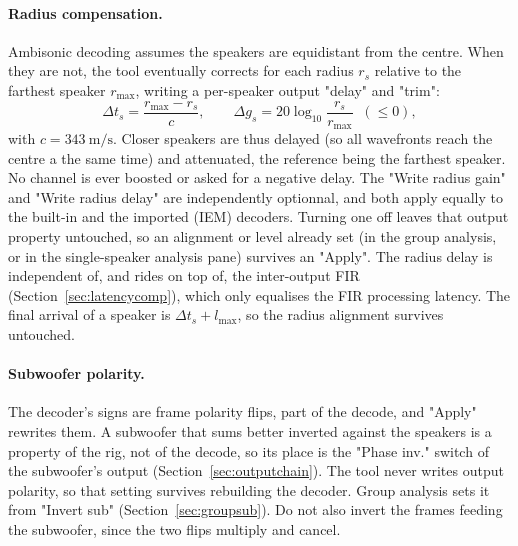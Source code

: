 \paragraph{Radius compensation.} Ambisonic decoding assumes the speakers are equidistant from the centre. When they are not, the tool eventually corrects for each radius $r_s$ relative to the farthest speaker $r_{\max}$, writing a per-speaker output "delay" and "trim":
\begin{equation}
  \Delta t_s = \frac{r_{\max}-r_s}{c}, \qquad
  \Delta g_s = 20\log_{10}\frac{r_s}{r_{\max}} \;\;(\le 0),
\end{equation}
with $c=\SI{343}{\metre\per\second}$. Closer speakers are thus delayed (so all wavefronts reach the centre a the same time) and attenuated, the reference being the farthest speaker. No channel is ever boosted or asked for a negative delay. The "Write radius gain" and "Write radius delay" are independently optionnal, and both apply equally to the built-in and the imported (IEM) decoders. Turning one off leaves that output property untouched, so an alignment or level already set (in the group analysis, or in the single-speaker analysis pane) survives an "Apply". The radius delay is independent of, and rides on top of, the inter-output FIR  (Section~\ref{sec:latencycomp}), which only equalises the FIR processing latency. The final arrival of a speaker is $\Delta t_s + l_{\max}$, so the radius alignment survives untouched.

\paragraph{Subwoofer polarity.} The decoder's signs are frame polarity flips, part of the decode, and "Apply" rewrites them. A subwoofer that sums better inverted against the speakers is a property of the rig, not of the decode, so its place is the "Phase inv." switch of the subwoofer's output (Section~\ref{sec:outputchain}). The tool never writes output polarity, so that setting survives rebuilding the decoder. Group analysis sets it from "Invert sub" (Section~\ref{sec:groupsub}). Do not also invert the frames feeding the subwoofer, since the two flips multiply and cancel.

